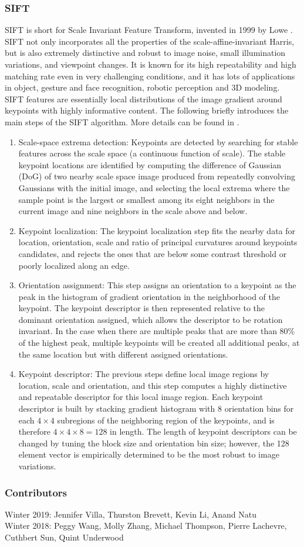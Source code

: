 \documentclass[twoside]{article}
\begin{document}
\subsubsection{SIFT}
SIFT is short for Scale Invariant Feature Transform, invented in 1999 by Lowe \cite{SIFT}. SIFT not only incorporates all the properties of the scale-affine-invariant Harris, but is also extremely distinctive and robust to image noise, small illumination variations, and viewpoint changes. It is known for its high repeatability and high matching rate even in very challenging conditions, and it has lots of applications in object, gesture and face recognition, robotic perception and 3D modeling. SIFT features are essentially local distributions of the image gradient around keypoints with highly informative content. The following briefly introduces the main steps of the SIFT algorithm. More details can be found in \cite{SIFT}.
\begin{enumerate}
\item Scale-space extrema detection: Keypoints are detected by searching for stable features across the scale space (a continuous function of scale). The stable keypoint locations are identified by computing the difference of Gaussian (DoG) of two nearby scale space image produced from repeatedly convolving Gaussians with the initial image, and selecting the local extrema where the sample point is the largest or smallest among its eight neighbors in the current image and nine neighbors in the scale above and below.
\item Keypoint localization: The keypoint localization step fits the nearby data for location, orientation, scale and ratio of principal curvatures around keypoints candidates, and rejects the ones that are below some contrast threshold or poorly localized along an edge.
\item Orientation assignment: This step assigns an orientation to a keypoint as the peak in the histogram of gradient orientation in the neighborhood of the keypoint. The keypoint descriptor is then represented relative to the dominant orientation assigned, which allows the descriptor to be rotation invariant. In the case when there are multiple peaks that are more than 80\% of the highest peak, multiple keypoints will be created all additional peaks, at the same location but with different assigned orientations.
\item Keypoint descriptor: The previous steps define local image regions by location, scale and orientation, and this step computes a highly distinctive and repeatable descriptor for this local image region. Each keypoint descriptor is built by stacking gradient histogram with 8 orientation bins for each $4\times 4 $ subregions of the neighboring region of the keypoints, and is therefore $4\times 4 \times 8 = 128$ in length. The length of keypoint descriptors can be changed by tuning the block size and orientation bin size; however, the 128 element vector is empirically determined to be the most robust to image variations.

\end{enumerate}



\subsubsection*{Contributors}
Winter 2019: Jennifer Villa, Thurston Brevett, Kevin Li, Anand Natu
\\
Winter 2018: Peggy Wang, Molly Zhang, Michael Thompson, Pierre Lachevre, Cuthbert Sun, Quint Underwood
\end{document}
